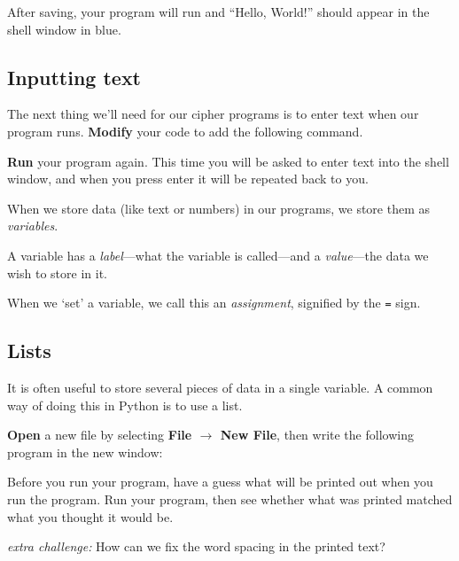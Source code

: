 		After saving, your program will run and ``Hello, World!'' should appear in the shell window in blue.
		
	\subsection*{Inputting text}
	
		The next thing we'll need for our cipher programs is to enter text when our program runs. \textbf{Modify} your code to add the following command.
		
		
		
		\textbf{Run} your program again. This time you will be asked to enter text into the shell window, and when you press enter it will be repeated back to you.
		
		\begin{aside}[Variables]
			When we store data (like text or numbers) in our programs, we store them as \textit{variables}.
			
			A variable has a \textit{label}---what the variable is called---and a \textit{value}---the data we wish to store in it.
			
			When we `set' a variable, we call this an \textit{assignment}, signified by the \texttt{=} sign.
		\end{aside}
	
	\subsection*{Lists}
	
		It is often useful to store several pieces of data in a single variable. A common way of doing this in Python is to use a list.
		
		\textbf{Open} a new file by selecting \textbf{File $\rightarrow$ New File}, then write the following program in the new window:
		
		
		
		Before you run your program, have a guess what will be printed out when you run the program. Run your program, then see whether what was printed matched what you thought it would be.
		
		\textit{extra challenge:} How can we fix the word spacing in the printed text?
		
